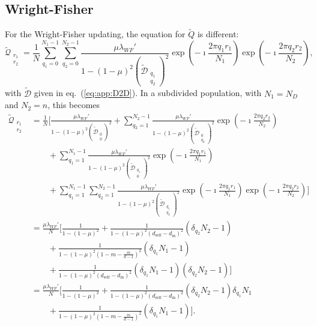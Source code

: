\documentclass[11pt, letterpaper]{article}
\renewcommand{\eqref}[1]{\textup{{\normalfont eq.~(\ref{#1}}\normalfont)}}
\newcommand{\din}{d_{\textrm{in}}}
\newcommand{\dself}{d_{\textrm{self}}}
\newcommand{\ndemes}{N_D}
\begin{document}
\subsection{Wright-Fisher}
For the Wright-Fisher updating, the equation for $\tilde{Q}$ is different:
\begin{equation}
\tilde{\mathcal{Q}}_{\substack{r_1\\r_2}} = \frac{1}{N} \sum_{q_1=0}^{N_1-1} \sum_{q_2=0}^{N_2 -1} \frac{\mu \lambda_{WF}'}{1-(1-\mu)^2 (\tilde{\mathcal{D}}_{\substack{q_1\\q_2}})^2} \exp\left(-\imath \frac{2\pi q_1 r_1}{N_1}\right)\exp\left(-\imath \frac{2\pi q_2 r_2}{N_2}\right), 
\end{equation}
with $\tilde{\mathcal{D}}$ given in \eqref{eq:app:D2D}. In a subdivided population, with $N_1 = \ndemes$ and $N_2 = n$, this becomes
\begin{align}
\tilde{\mathcal{Q}}_{\substack{r_1\\r_2}} 
%
& = \frac{1}{N} \Bigg[ 
\frac{\mu \lambda_{WF}'}{1-(1-\mu)^2 (\tilde{\mathcal{D}}_{\substack{0\\0}})^2} 
+ \sum_{q_2=1}^{N_2-1} \frac{\mu \lambda_{WF}'}{1-(1-\mu)^2 (\tilde{\mathcal{D}}_{\substack{0\\q_2}})^2} \exp\left(-\imath \frac{2\pi q_2 r_2}{N_2}\right) \nonumber \\
& \qquad + \sum_{q_1=1}^{N_1-1} \frac{\mu \lambda_{WF}'}{1-(1-\mu)^2 (\tilde{\mathcal{D}}_{\substack{q_1\\0}})^2} \exp\left(-\imath \frac{2\pi q_1 r_1}{N_1}\right)  \nonumber \\
& \qquad + \sum_{q_1=1}^{N_1-1} \sum_{q_2=1}^{N_2 -1} \frac{\mu \lambda_{WF}'}{1-(1-\mu)^2 (\tilde{\mathcal{D}}_{\substack{q_1\\q_2}})^2} \exp\left(-\imath \frac{2\pi q_1 r_1}{N_1}\right)\exp\left(-\imath \frac{2\pi q_2 r_2}{N_2}\right)
 \Bigg] \nonumber\\
& = \frac{\mu \lambda_{WF}'}{N} \Bigg[ 
\frac{1}{1-(1-\mu)^2 } 
%
+ \frac{1}{1-(1-\mu)^2 (\dself - \din)^2} (\delta_{q_2} N_2 - 1) \nonumber \\
%
& \qquad +  \frac{1}{1-(1-\mu)^2 (1-m-\frac{m}{d-1})^2} (\delta_{q_1} N_1 - 1) \nonumber \\
%
& \qquad +  \frac{1}{1-(1-\mu)^2 (\dself - \din)^2} (\delta_{q_1} N_1 - 1)(\delta_{q_2} N_2 - 1)
 \Bigg] \nonumber\\
& = \frac{\mu \lambda_{WF}'}{N} \Bigg[ 
\frac{1}{1-(1-\mu)^2 } 
%
+ \frac{1}{1-(1-\mu)^2 (\dself - \din)^2} (\delta_{q_2} N_2 - 1) \delta_{q_1} N_1 \nonumber \\
%
& \qquad +  \frac{1}{1-(1-\mu)^2 (1-m-\frac{m}{d-1})^2} (\delta_{q_1} N_1 - 1) 
\Bigg] . \label{eq:app:Q2DWFsol}
\end{align}
\end{document}
